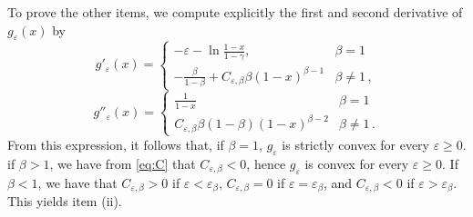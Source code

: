 \documentclass{article}
\begin{document}
To prove the other items, we compute
explicitly the first and second derivative of $g_\varepsilon(x)$ by
        \begin{equation}\label{eq:g'}   
            g'_{\varepsilon}(x) = \begin{cases}
                -\varepsilon -\ln{\displaystyle\frac{1-x}{1-\gamma}}, & \beta = 1\\[10pt]
                -\displaystyle\frac{\beta}{1 - \beta}+C_{\varepsilon,\beta}\beta(1-x)^{\beta-1} & \beta \neq 1\,,
            \end{cases}
        \end{equation}
        \begin{equation}\label{eq:g''}
            g''_{\varepsilon}(x) = \begin{cases}
                \displaystyle\frac{1}{1-x} & \beta = 1\\[10pt]
                C_{\varepsilon,\beta} \beta(1-\beta)(1 - x)^{\beta - 2} & \beta \neq 1\,.
            \end{cases}
        \end{equation}
        From this expression, it follows that, if $\beta = 1$, $g_\varepsilon$ is strictly convex for every $\varepsilon \ge 0$. if $\beta > 1$, we have from \eqref{eq:C} that $C_{\varepsilon,\beta}<0$, hence $g_\varepsilon$ is convex for every $\varepsilon \ge 0$. If $\beta<1$, we have that $C_{\varepsilon,\beta}>0$ if $\varepsilon < \varepsilon_\beta$, $C_{\varepsilon,\beta} = 0$ if $\varepsilon = \varepsilon_\beta$, and $C_{\varepsilon,\beta}<0$ if $\varepsilon > \varepsilon_\beta$. This yields item (ii).
        
\end{document}
